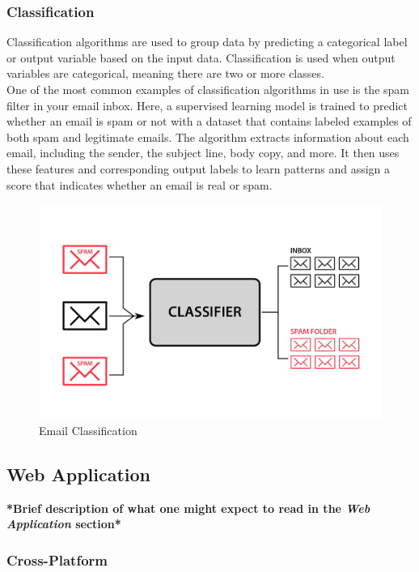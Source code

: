 \subsubsection*{Classification}

Classification algorithms are used to group data by predicting a categorical label or output variable based on the input data. Classification is used when output variables are categorical, meaning there are two or more classes. \cite{google:supervised-learning} \\

One of the most common examples of classification algorithms in use is the spam filter in your email inbox. Here, a supervised learning model is trained to predict whether an email is spam or not with a dataset that contains labeled examples of both spam and legitimate emails. The algorithm extracts information about each email, including the sender, the subject line, body copy, and more. It then uses these features and corresponding output labels to learn patterns and assign a score that indicates whether an email is real or spam. \cite{google:supervised-learning}

\begin{figure}[h!]
    \centering
    \includegraphics[width=0.75\linewidth]{figures/theory/classification.jpg}
    \caption{Email Classification \cite{analytixlabs:classification}}
    \label{fig:classification}
\end{figure}

\subsection{Web Application}

\textbf{*Brief description of what one might expect to read in the \textit{Web Application} section*}

\subsubsection*{Cross-Platform}

